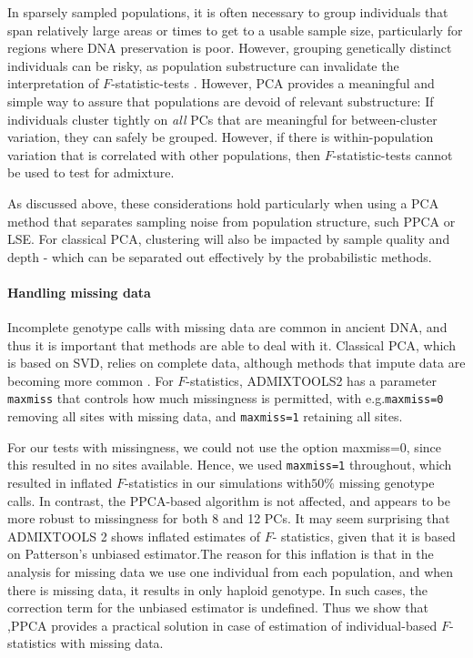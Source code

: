 \documentclass[12pt, letterpaper]{article}
\begin{document}
In sparsely sampled populations, it is often necessary to group individuals that span relatively large areas or times to get to a usable sample size, particularly for regions where DNA preservation is poor. However, grouping genetically distinct individuals can be risky, as population substructure can invalidate the interpretation of $F$-statistic-tests \cite{peter_admixture_2016}. However, PCA provides a meaningful and simple way to assure that populations are devoid of relevant substructure: If individuals  cluster tightly on \emph{all} PCs that are meaningful for between-cluster variation, they can safely be grouped. However, if there is within-population variation that is correlated with other populations, then $F$-statistic-tests cannot be used to test for admixture. 

As discussed above, these considerations hold particularly when using a PCA method that separates sampling noise from population structure, such PPCA or LSE. For classical PCA, clustering will also be impacted by sample quality and depth - which can be separated out effectively by the probabilistic methods.



\paragraph{Handling missing data}
Incomplete genotype calls with missing data are common in ancient DNA, and thus it is important that methods are able to deal with it. Classical PCA, which is based on SVD, relies on complete data, although methods that impute data are becoming more common \citep{meisner_large-scale_2021}. For $F$-statistics, ADMIXTOOLS2 has a parameter \texttt{maxmiss} that controls how much missingness is permitted, with e.g.\texttt{maxmiss=0} removing all sites with missing data, and \texttt{maxmiss=1} retaining all sites.

For our tests with missingness, we could not use the option maxmiss=0, since this resulted in no sites available. Hence, we used \texttt{maxmiss=1} throughout, which resulted in inflated $F$-statistics in our simulations with$50\%$ missing genotype calls. In contrast, the  PPCA-based algorithm is not affected, and appears to be more robust to missingness for both 8 and 12 PCs. It may seem surprising that ADMIXTOOLS 2 shows inflated estimates of $F$- statistics, given that it is based on Patterson's unbiased estimator.The reason for this inflation is that in the analysis for missing data we use one individual from each population, and when there is missing data, it results in only haploid genotype. In such cases, the correction term for the unbiased estimator is undefined. Thus we show that ,PPCA provides a practical solution in case of estimation of individual-based $F$-statistics with missing data. 
\end{document}
